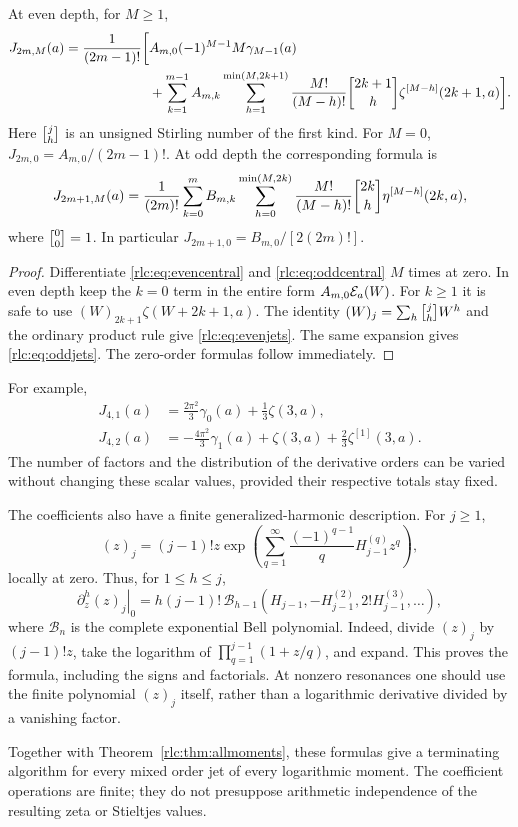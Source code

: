 \begin{theorem}
\label{rlc:thm:alljets}
At even depth, for $M\ge1$,
\begin{align}
 J_{2m,M}(a)=\frac1{(2m-1)!}\biggl[&
 A_{m,0}(-1)^{M-1}M\gamma_{M-1}(a)\notag\\
 &+\sum_{k=1}^{m-1}A_{m,k}
 \sum_{h=1}^{\min(M,2k+1)}
 \frac{M!}{(M-h)!}\stir{2k+1}{h}
       \zeta^{[M-h]}(2k+1,a)\biggr].
 \label{rlc:eq:evenjets}
\end{align}
Here $\stir{j}{h}$ is an unsigned Stirling number of the first kind.
For $M=0$, $J_{2m,0}=A_{m,0}/(2m-1)!$.
At odd depth the corresponding formula is
\begin{equation}\label{rlc:eq:oddjets}
 J_{2m+1,M}(a)=\frac1{(2m)!}
 \sum_{k=0}^{m}B_{m,k}
 \sum_{h=0}^{\min(M,2k)}
 \frac{M!}{(M-h)!}\stir{2k}{h}
          \eta^{[M-h]}(2k,a),
\end{equation}
where $\stir00=1$. In particular $J_{2m+1,0}=B_{m,0}/[2(2m)!]$.
\end{theorem}
\begin{proof}
Differentiate \eqref{rlc:eq:evencentral} and
\eqref{rlc:eq:oddcentral} $M$ times at zero. In even depth keep the
$k=0$ term in the entire form $A_{m,0}\mathcal E_a(W)$. For $k\ge1$ it is
safe to use $(W)_{2k+1}\zeta(W+2k+1,a)$.
The identity $(W)_j=\sum_h\stir jh W^h$ and the ordinary product rule
give \eqref{rlc:eq:evenjets}. The same expansion gives
\eqref{rlc:eq:oddjets}. The zero-order formulas follow immediately.
\end{proof}

For example,
\begin{align}
 J_{4,1}(a)&=\frac{2\pi^2}{3}\gamma_0(a)+\frac13\zeta(3,a),
 \label{rlc:eq:J41}\\
 J_{4,2}(a)&=-\frac{4\pi^2}{3}\gamma_1(a)
              +\zeta(3,a)+\frac23\zeta^{[1]}(3,a).
 \label{rlc:eq:J42}
\end{align}
The number of factors and the distribution of the derivative orders
can be varied without changing these scalar values, provided their
respective totals stay fixed.

The coefficients also have a finite generalized-harmonic description.
For $j\ge1$,
\begin{equation}\label{rlc:eq:pochhammerharmonic}
 (z)_j=(j-1)!z\exp\left(
 \sum_{q=1}^\infty\frac{(-1)^{q-1}}q H_{j-1}^{(q)}z^q\right),
\end{equation}
locally at zero. Thus, for $1\le h\le j$,
\begin{equation}\label{rlc:eq:Bellharmonic}
 \left.\partial_z^h(z)_j\right|_{0}
 =h(j-1)!\,\mathcal B_{h-1}
 \left(H_{j-1},-H_{j-1}^{(2)},2!H_{j-1}^{(3)},\ldots\right),
\end{equation}
where $\mathcal B_n$ is the complete exponential Bell polynomial.
Indeed, divide $(z)_j$ by $(j-1)!z$, take the logarithm of
$\prod_{q=1}^{j-1}(1+z/q)$, and expand. This proves the formula,
including the signs and factorials. At nonzero resonances one should
use the finite polynomial $(z)_j$ itself, rather than a logarithmic
derivative divided by a vanishing factor.

Together with Theorem~\ref{rlc:thm:allmoments}, these formulas give a
terminating algorithm for every mixed order jet of every logarithmic
moment. The coefficient operations are finite; they do not presuppose
arithmetic independence of the resulting zeta or Stieltjes values.
